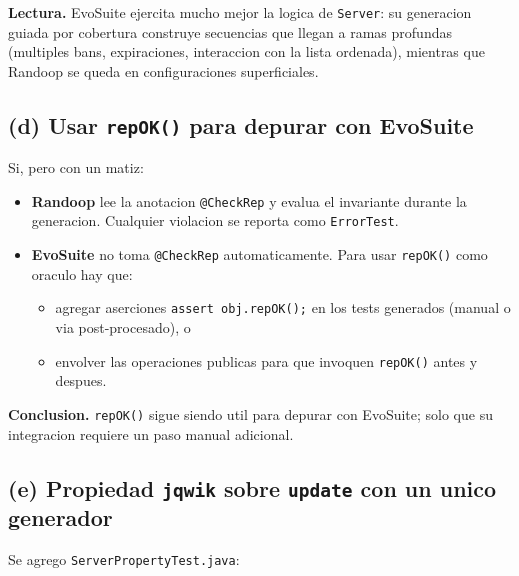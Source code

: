 \documentclass[12pt,a4paper]{article}
\begin{document}
\textbf{Lectura.} EvoSuite ejercita mucho mejor la logica de \texttt{Server}: su generacion
guiada por cobertura construye secuencias que llegan a ramas profundas (multiples bans,
expiraciones, interaccion con la lista ordenada), mientras que Randoop se queda en
configuraciones superficiales.

\subsection{(d) Usar \texttt{repOK()} para depurar con EvoSuite}

Si, pero con un matiz:

\begin{itemize}
  \item \textbf{Randoop} lee la anotacion \texttt{@CheckRep} y evalua el invariante durante la
  generacion. Cualquier violacion se reporta como \texttt{ErrorTest}.
  \item \textbf{EvoSuite} no toma \texttt{@CheckRep} automaticamente. Para usar
  \texttt{repOK()} como oraculo hay que:
  \begin{itemize}
    \item agregar aserciones \texttt{assert obj.repOK();} en los tests generados (manual o
    via post-procesado), o
    \item envolver las operaciones publicas para que invoquen \texttt{repOK()} antes y
    despues.
  \end{itemize}
\end{itemize}

\textbf{Conclusion.} \texttt{repOK()} sigue siendo util para depurar con EvoSuite; solo que
su integracion requiere un paso manual adicional.

\subsection{(e) Propiedad \texttt{jqwik} sobre \texttt{update} con un unico generador}

Se agrego \texttt{ServerPropertyTest.java}:
\end{document}
